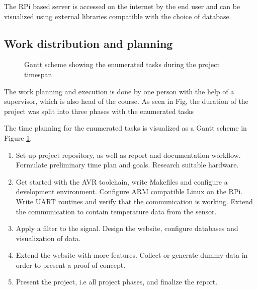 The RPi based server is accessed on the internet by the end user and can be visualized using external libraries compatible with the choice of database.

\subsection{Work distribution and planning}%
\label{sub:work_distribution_and_planning}
\begin{figure}[h]
  \centering
  
  \caption{Gantt scheme showing the enumerated tasks during the project timespan}
  \label{fig:gantt}
\end{figure}

The work planning and execution is done by one person with the help of a supervisor, which is also head of the course. As seen in Fig, the duration of the project was split into three phases with the enumerated tasks

The time planning for the enumerated tasks is visualized as a Gantt scheme in Figure \ref{fig:gantt}.
\begin{enumerate}
  \item
Set up project repository, as well as report and documentation workflow. Formulate preliminary time plan and goals. Research suitable hardware.
  \item
Get started with the AVR toolchain, write Makefiles and configure a development environment. Configure ARM compatible Linux on the RPi. Write UART routines and verify that the communication is working. Extend the communication to contain temperature data from the sensor.
  \item
    Apply a filter to the signal. Design the website, configure databases and visualization of data.
  \item
    Extend the website with more features. Collect or generate dummy-data in order to present a proof of concept.
  \item Present the project, i.e all project phases, and finalize the report.
\end{enumerate}

\newpage

